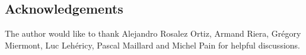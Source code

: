 \documentclass[10pt,a4paper]{article}
\begin{document}
\subsection*{Acknowledgements}

The author would like to thank Alejandro Rosalez Ortiz, Armand Riera, Grégory Miermont, Luc Lehéricy, Pascal Maillard and Michel Pain for helpful discussions. %









\end{document}
